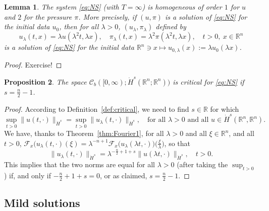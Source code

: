 \documentclass[a4paper, 12pt]{article}
\theoremstyle{plain}
\newtheorem{proposition}{Proposition}[section]
\newtheorem{lemma}[proposition]{Lemma}
\theoremstyle{definition}
\theoremstyle{remark}
\numberwithin{equation}{section}
\begin{document}
\begin{lemma}
The system \eqref{eq:NS} (with $T=\infty$) is homogeneous of order $1$ for $u$ and $2$ for the pressure $\pi$. More precisely, if $(u,\pi)$ is 
a solution of \eqref{eq:NS} for the initial data $u_0$, then for all $\lambda >0$, $(u_\lambda,\pi_\lambda)$ defined by
\[
u_\lambda(t,x)=\lambda u(\lambda^2t,\lambda x), \quad \pi_\lambda(t,x)=\lambda^2\pi(\lambda^2t,\lambda x), \quad t>0, \ x\in{\mathds{R}}^n
\]
is a solution of \eqref{eq:NS} for the initial data ${\mathds{R}}^n \ni x\mapsto u_{0,\lambda}(x):=\lambda u_0(\lambda x)$.
\end{lemma}

\begin{proof}
Exercise!
\end{proof}

\begin{proposition}
\label{prop:criticalNS}
The space ${\mathscr{C}}_b([0,\infty);\dot H^s({\mathds{R}}^n;{\mathds{R}}^n))$ is critical for \eqref{eq:NS} if $s=\tfrac{n}{2}-1$.
\end{proposition}

\begin{proof}
According to Definition~\ref{def:critical}, we need to find $s\in{\mathds{R}}$ for which 
\[
\sup_{t>0}\|u(t,\cdot)\|_{\dot H^s}=\sup_{t>0}\|u_\lambda(t,\cdot)\|_{\dot H^s}, \quad \mbox{for all }\lambda>0
\mbox{ and all }u\in \dot H^s({\mathds{R}}^n,{\mathds{R}}^n).
\]
We have, thanks to Theorem~\ref{thm:Fourier1}, for all $\lambda>0$ and all $\xi\in{\mathds{R}}^n$, and all $t>0$,
${\mathscr{F}}_x(u_\lambda(t,\cdot)(\xi)=\lambda^{-n+1}{\mathscr{F}}_x\bigl(u_\lambda(\lambda t,\cdot)\bigr)\bigl(\tfrac{\xi}{\lambda}\bigr)$,
so that 
\[
\bigl\|u_\lambda(t,\cdot)\bigr\|_{\dot H^s}=\lambda^{-\frac{n}{2}+1+s}\bigl\|u(\lambda t,\cdot)\bigr\|_{\dot H^s}, \quad t>0.
\]
This implies that the two norms are equal for all $\lambda>0$ (after taking the $\sup_{t>0}$) if, and only if $-\frac{n}{2}+1+s=0$, or 
as claimed, $s=\frac{n}{2}-1$.
\end{proof}

\subsection{Mild solutions}
\label{subsec:mild}
\end{document}
